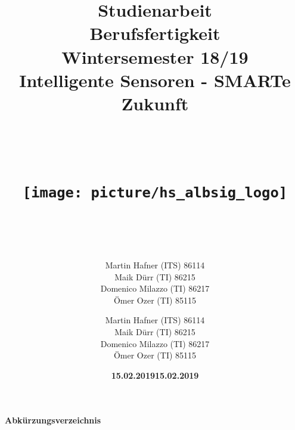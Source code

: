 \documentclass[a4paper,12pt]{scrartcl}
\begin{document}
\title{Studienarbeit \vspace{20px} \hfill \\ Berufsfertigkeit\\ Wintersemester 18/19 \vspace{20px} \hfill \\  \vspace{50px} 
Intelligente Sensoren - SMARTe Zukunft \hfill \\ \hfill \\
\hfill \\ 
\begin{center}
\texttt{[image: picture/hs\_albsig\_logo]}
\end{center}
\hfill \\  \vspace{10px}
}



\author{Martin Hafner (ITS) 86114 \hfill \\
Maik Dürr (TI) 86215 \hfill \\
Domenico Milazzo (TI) 86217 \hfill \\
Ömer Ozer (TI) 85115 \hfill \\
}
\vspace{10px}
\date{\textbf{15.02.2019}}

\author{Martin Hafner (ITS) 86114 \hfill \\
Maik Dürr (TI) 86215 \hfill \\
Domenico Milazzo (TI) 86217 \hfill \\
Ömer Ozer (TI) 85115 \hfill \\}
\date{\textbf{15.02.2019}}

\maketitle
\thispagestyle{empty}
\clearpage
\tableofcontents
\newpage
\paragraph{\Large{Abkürzungsverzeichnis}}
\begin{acronym}[Bash]
\end{acronym}
\onehalfspacing
\newpage
\end{document}
